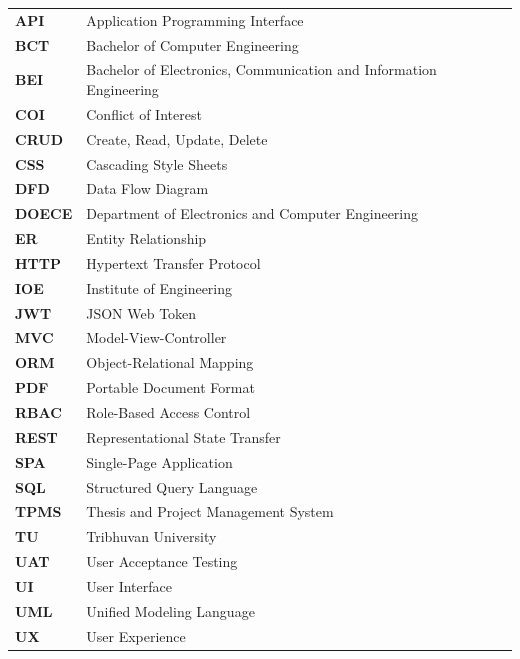 \begin{tabular}{@{}ll@{}}
\textbf{API}   & Application Programming Interface \\
\textbf{BCT}   & Bachelor of Computer Engineering \\
\textbf{BEI}   & Bachelor of Electronics, Communication and Information Engineering \\
\textbf{COI}   & Conflict of Interest \\
\textbf{CRUD}  & Create, Read, Update, Delete \\
\textbf{CSS}   & Cascading Style Sheets \\
\textbf{DFD}   & Data Flow Diagram \\
\textbf{DOECE} & Department of Electronics and Computer Engineering \\
\textbf{ER}    & Entity Relationship \\
\textbf{HTTP}  & Hypertext Transfer Protocol \\
\textbf{IOE}   & Institute of Engineering \\
\textbf{JWT}   & JSON Web Token \\
\textbf{MVC}   & Model-View-Controller \\
\textbf{ORM}   & Object-Relational Mapping \\
\textbf{PDF}   & Portable Document Format \\
\textbf{RBAC}  & Role-Based Access Control \\
\textbf{REST}  & Representational State Transfer \\
\textbf{SPA}   & Single-Page Application \\
\textbf{SQL}   & Structured Query Language \\
\textbf{TPMS}  & Thesis and Project Management System \\
\textbf{TU}    & Tribhuvan University \\
\textbf{UAT}   & User Acceptance Testing \\
\textbf{UI}    & User Interface \\
\textbf{UML}   & Unified Modeling Language \\
\textbf{UX}    & User Experience \\
\end{tabular}
